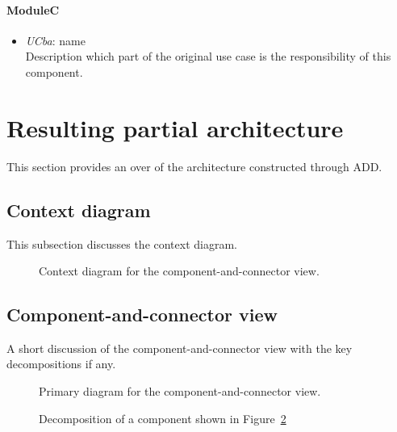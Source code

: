 \documentclass[a4paper,10pt]{article}
\begin{document}
\paragraph{ModuleC}
\begin{itemize}
    \item \emph{UCba}: name\\Description which part of the original use case is
        the responsibility of this component.
\end{itemize}

\section{Resulting partial architecture}\label{sec:architecture}
This section provides an over of the architecture constructed through ADD\@.

\subsection{Context diagram}
This subsection discusses the context diagram.

\begin{figure}[!htp]
    \centering
    \caption{Context diagram for the component-and-connector view.
        }\label{fig:cc_context}
\end{figure}

\subsection{Component-and-connector view}
A short discussion of the component-and-connector view with the key
decompositions if any.

\begin{figure}[!htp]
    \centering
    \caption{Primary diagram for the component-and-connector view.
        }\label{fig:cc_main}
\end{figure}

\begin{figure}[!htp]
    \centering
    \caption{Decomposition of a component shown in Figure~\ref{fig:cc_main}
        }\label{fig:decomp_decomp1}
\end{figure}
\end{document}
